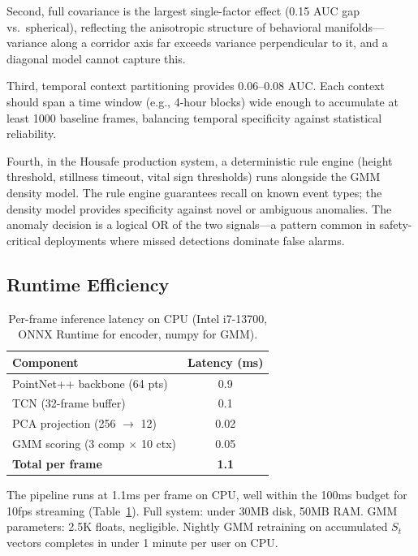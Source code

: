 \documentclass[11pt,a4paper]{article}
\begin{document}
Second, full covariance is the largest single-factor effect (0.15 AUC gap vs.\ spherical), reflecting the anisotropic structure of behavioral manifolds---variance along a corridor axis far exceeds variance perpendicular to it, and a diagonal model cannot capture this.

Third, temporal context partitioning provides 0.06--0.08 AUC.
Each context should span a time window (e.g., 4-hour blocks) wide enough to accumulate at least 1000 baseline frames, balancing temporal specificity against statistical reliability.

Fourth, in the Housafe production system, a deterministic rule engine (height threshold, stillness timeout, vital sign thresholds) runs alongside the GMM density model.
The rule engine guarantees recall on known event types; the density model provides specificity against novel or ambiguous anomalies.
The anomaly decision is a logical OR of the two signals---a pattern common in safety-critical deployments where missed detections dominate false alarms.

\subsection{Runtime Efficiency}

\begin{table}[H]
\centering
\caption{Per-frame inference latency on CPU (Intel i7-13700, ONNX Runtime for encoder, numpy for GMM).}
\label{tab:latency}
\begin{tabular}{lc}
\toprule
\textbf{Component} & \textbf{Latency (ms)} \\
\midrule
PointNet++ backbone (64 pts)              & 0.9 \\
TCN (32-frame buffer)                     & 0.1 \\
PCA projection (256 $\to$ 12)              & 0.02 \\
GMM scoring (3 comp $\times$ 10 ctx)       & 0.05 \\
\midrule
\textbf{Total per frame}                  & \textbf{1.1} \\
\bottomrule
\end{tabular}
\end{table}

The pipeline runs at 1.1ms per frame on CPU, well within the 100ms budget for 10fps streaming (Table~\ref{tab:latency}).
Full system: under 30MB disk, 50MB RAM. GMM parameters: 2.5K floats, negligible.
Nightly GMM retraining on accumulated $S_t$ vectors completes in under 1 minute per user on CPU.
\end{document}
